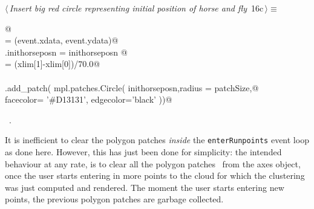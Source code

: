 \documentclass[11.5pt]{report}
\begin{document}
\vspace{-0.8cm} \newchunk
\begin{flushleft} \small
\begin{minipage}{\linewidth}\label{scrap9}\raggedright\small
{} $\langle\,${\itshape Insert big red circle representing initial position of horse and fly}\nobreak\ {\footnotesize {16c}}$\,\rangle\equiv$
\vspace{-1ex}
\begin{list}{}{} \item
\mbox{}\verb@ @\\
\mbox{}\verb@inithorseposn = (event.xdata, event.ydata)@\\
\mbox{}\verb@run.inithorseposn = inithorseposn  @\\
\mbox{}\verb@patchSize  = (xlim[1]-xlim[0])/70.0@\\
\mbox{}\verb@@\\
\mbox{}\verb@ax.add_patch( mpl.patches.Circle( inithorseposn,radius = patchSize,@\\
\mbox{}\verb@                                  facecolor= '#D13131', edgecolor='black' ))@\\
\mbox{}\verb@@{\NWsep}
\end{list}
\vspace{-1.5ex}
\footnotesize
\begin{list}{}{\setlength{\itemsep}{-\parsep}\setlength{\itemindent}{-\leftmargin}}
\item \NWtxtMacroRefIn\ .

\item{}
\end{list}
\end{minipage}\vspace{4ex}
\end{flushleft}



\vspace{-0.8cm} \newchunk   
 It is inefficient to clear the polygon patches \textit{inside} the
 \verb|enterRunpoints| event loop as done here. However, this has just been done for 
 simplicity: the intended behaviour at any rate, is to clear all the polygon patches \
 from the axes object, once the user starts entering in more points to the cloud
 for which the clustering was just computed and rendered. The moment the user starts 
 entering new points, the previous polygon patches are garbage collected. 
\end{document}
